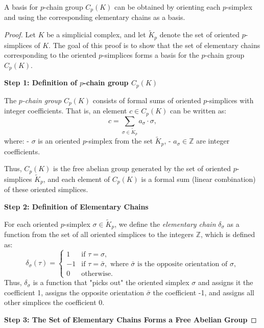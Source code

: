 \documentclass[10pt,a4paper]{amsart}
\begin{document}
\begin{lemma}\label{l:Computing Bases of Chain Groups via Elementary Chains}
A basis for $p$-chain group $C_{p}(K)$ can be obtained by orienting each $p$-simplex and using the corresponding elementary chains as a basis.   
\end{lemma}

\begin{proof}
Let $K$ be a simplicial complex, and let $\widetilde{K}_p$ denote the set of oriented $p$-simplices of $K$. The goal of this proof is to show that the set of elementary chains corresponding to the oriented $p$-simplices forms a basis for the $p$-chain group $C_p(K)$.

\textbf{Step 1: Definition of $p$-chain group $C_p(K)$}

The \textit{$p$-chain group} $C_p(K)$ consists of formal sums of oriented $p$-simplices with integer coefficients. That is, an element $c \in C_p(K)$ can be written as:
\[
c = \sum_{\sigma \in \widetilde{K}_p} a_\sigma \cdot \sigma,
\]
where:
- $\sigma$ is an oriented $p$-simplex from the set $\widetilde{K}_p$,
- $a_\sigma \in \mathbb{Z}$ are integer coefficients.

Thus, $C_p(K)$ is the free abelian group generated by the set of oriented $p$-simplices $\widetilde{K}_p$, and each element of $C_p(K)$ is a formal sum (linear combination) of these oriented simplices.

\textbf{Step 2: Definition of Elementary Chains}

For each oriented $p$-simplex $\sigma \in \widetilde{K}_p$, we define the \textit{elementary chain} $\delta_\sigma$ as a function from the set of all oriented simplices to the integers $\mathbb{Z}$, which is defined as:
\[
\delta_\sigma(\tau) = 
\begin{cases}
1 & \text{if } \tau = \sigma, \\
-1 & \text{if } \tau = \bar{\sigma}, \text{ where } \bar{\sigma} \text{ is the opposite orientation of } \sigma, \\
0 & \text{otherwise}.
\end{cases}
\]
Thus, $\delta_\sigma$ is a function that "picks out" the oriented simplex $\sigma$ and assigns it the coefficient 1, assigns the opposite orientation $\bar{\sigma}$ the coefficient -1, and assigns all other simplices the coefficient 0.

\textbf{Step 3: The Set of Elementary Chains Forms a Free Abelian Group}


\end{proof}
\end{document}
